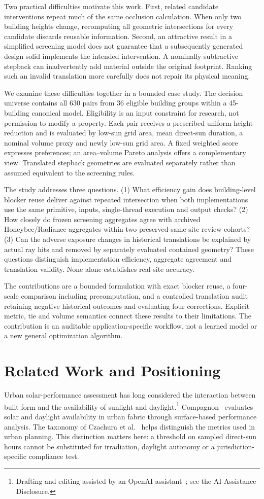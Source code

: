 \documentclass{llncs}
\newcommand{\aidraft}{\footnote{Drafting and editing assisted by an OpenAI assistant~\cite{openai2026}; see the AI-Assistance Disclosure.}}
\begin{document}
Two practical difficulties motivate this work. First, related candidate interventions repeat much of the same occlusion calculation. When only two building heights change, recomputing all geometric intersections for every candidate discards reusable information. Second, an attractive result in a simplified screening model does not guarantee that a subsequently generated design solid implements the intended intervention. A nominally subtractive stepback can inadvertently add material outside the original footprint. Ranking such an invalid translation more carefully does not repair its physical meaning.

We examine these difficulties together in a bounded case study. The decision universe contains all 630 pairs from 36 eligible building groups within a 45-building canonical model. Eligibility is an input constraint for research, not permission to modify a property. Each pair receives a prescribed uniform-height reduction and is evaluated by low-sun grid area, mean direct-sun duration, a nominal volume proxy and newly low-sun grid area. A fixed weighted score expresses preferences; an area--volume Pareto analysis offers a complementary view. Translated stepback geometries are evaluated separately rather than assumed equivalent to the screening rules.

The study addresses three questions. (1) What efficiency gain does building-level blocker reuse deliver against repeated intersection when both implementations use the same primitive, inputs, single-thread execution and output checks? (2) How closely do frozen screening aggregates agree with archived Honeybee/Radiance aggregates within two preserved same-site review cohorts? (3) Can the adverse exposure changes in historical translations be explained by actual ray hits and removed by separately evaluated contained geometry? These questions distinguish implementation efficiency, aggregate agreement and translation validity. None alone establishes real-site accuracy.

The contributions are a bounded formulation with exact blocker reuse, a four-scale comparison including precomputation, and a controlled translation audit retaining negative historical outcomes and evaluating four corrections. Explicit metric, tie and volume semantics connect these results to their limitations. The contribution is an auditable application-specific workflow, not a learned model or a new general optimization algorithm.

\section{Related Work and Positioning}
Urban solar-performance assessment has long considered the interaction between built form and the availability of sunlight and daylight.\aidraft{} Compagnon~\cite{compagnon2004urban} evaluates solar and daylight availability in urban fabric through surface-based performance analysis. The taxonomy of Czachura et al.~\cite{czachura2022metrics} helps distinguish the metrics used in urban planning. This distinction matters here: a threshold on sampled direct-sun hours cannot be substituted for irradiation, daylight autonomy or a jurisdiction-specific compliance test.
\end{document}
